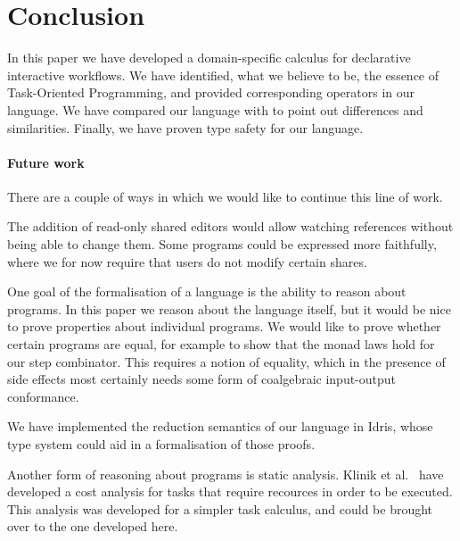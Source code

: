 
\section{Conclusion}

\label{sec:conclusions}

In this paper we have developed a domain-specific calculus for declarative interactive workflows.
We have identified, what we believe to be, the essence of Task-Oriented Programming, and provided corresponding operators in our language.
We have compared our language with \CSP to point out differences and similarities.
Finally, we have proven type safety for our language.



\paragraph{Future work}

There are a couple of ways in which we would like to continue this line of work.

The addition of read-only shared editors would allow watching references without being able to change them.
Some programs could be expressed more faithfully, where we for now require that users do not modify certain shares.

One goal of the formalisation of a language is the ability to reason about programs.
In this paper we reason about the language itself, but it would be nice to prove properties about individual programs.
We would like to prove whether certain programs are equal, for example to show that the monad laws hold for our step combinator.
This requires a notion of equality, which in the presence of side effects most certainly needs some form of coalgebraic input-output conformance.

We have implemented the reduction semantics of our language in Idris, whose type system could aid in a formalisation of those proofs.

Another form of reasoning about programs is static analysis.
Klinik et al.~\cite{conf/ifl/KlinikJP17} have developed a cost analysis for tasks that require recources in order to be executed.
This analysis was developed for a simpler task calculus, and could be brought over to the one developed here.

